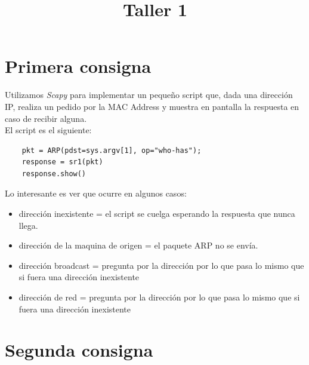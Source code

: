 \documentclass[a4paper]{article}
\title{Taller 1}
\begin{document}


\maketitle

\newpage

\tableofcontents


\newpage

\section{Primera consigna}

Utilizamos \textit{Scapy} para implementar un pequeño script que, dada una dirección IP, realiza un pedido por la MAC Address y muestra en pantalla la respuesta en caso de recibir alguna.\\

El script es el siguiente:

\begin{verbatim}
	pkt = ARP(pdst=sys.argv[1], op="who-has");
	response = sr1(pkt)
	response.show()
\end{verbatim}

Lo interesante es ver que ocurre en algunos casos:

\begin{itemize}
\item dirección inexistente = el script se cuelga esperando la respuesta que nunca llega. 
\item dirección de la maquina de origen = el paquete ARP no se envía.
\item dirección broadcast = pregunta por la dirección por lo que pasa lo mismo que si fuera una dirección inexistente 
\item dirección de red = pregunta por la dirección por lo que pasa lo mismo que si fuera una dirección inexistente 
\end{itemize}


\section{Segunda consigna}
\end{document}
